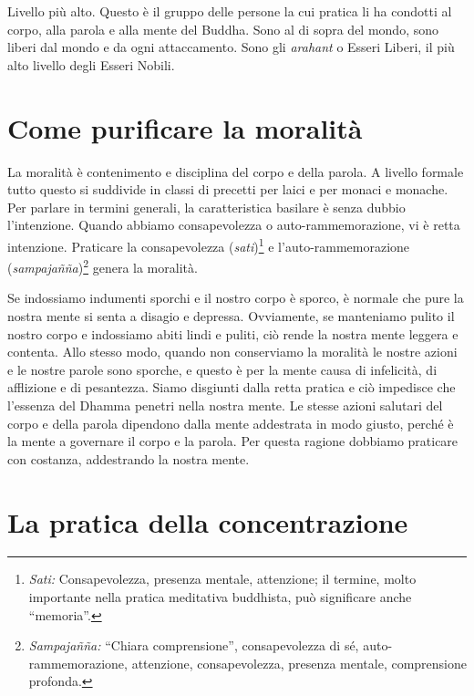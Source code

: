 Livello più alto. Questo è il gruppo delle persone la cui pratica li ha
condotti al corpo, alla parola e alla mente del Buddha. Sono al di sopra
del mondo, sono liberi dal mondo e da ogni attaccamento. Sono gli
\emph{arahant} o Esseri Liberi, il più alto livello degli Esseri Nobili.

\section{Come purificare la moralità}

La moralità è contenimento e disciplina del corpo e della parola. A
livello formale tutto questo si suddivide in classi di precetti per
laici e per monaci e monache. Per parlare in termini generali, la
caratteristica basilare è senza dubbio l'intenzione. Quando abbiamo
consapevolezza o auto-rammemorazione, vi è retta intenzione. Praticare
la consapevolezza (\emph{sati})\footnote{\emph{Sati:} Consapevolezza,
  presenza mentale, attenzione; il termine, molto importante nella
  pratica meditativa buddhista, può significare anche ``memoria''.} e
l'auto-rammemorazione (\emph{sampajañña})\footnote{\emph{Sampajañña:}
  ``Chiara comprensione'', consapevolezza di sé, auto-rammemorazione,
  attenzione, consapevolezza, presenza mentale, comprensione profonda.}
genera la moralità.

Se indossiamo indumenti sporchi e il nostro corpo è sporco, è normale
che pure la nostra mente si senta a disagio e depressa. Ovviamente, se
manteniamo pulito il nostro corpo e indossiamo abiti lindi e puliti, ciò
rende la nostra mente leggera e contenta. Allo stesso modo, quando non
conserviamo la moralità le nostre azioni e le nostre parole sono
sporche, e questo è per la mente causa di infelicità, di afflizione e di
pesantezza. Siamo disgiunti dalla retta pratica e ciò impedisce che
l'essenza del Dhamma penetri nella nostra mente. Le stesse azioni
salutari del corpo e della parola dipendono dalla mente addestrata in
modo giusto, perché è la mente a governare il corpo e la parola. Per
questa ragione dobbiamo praticare con costanza, addestrando la nostra
mente.

\section{La pratica della concentrazione}

